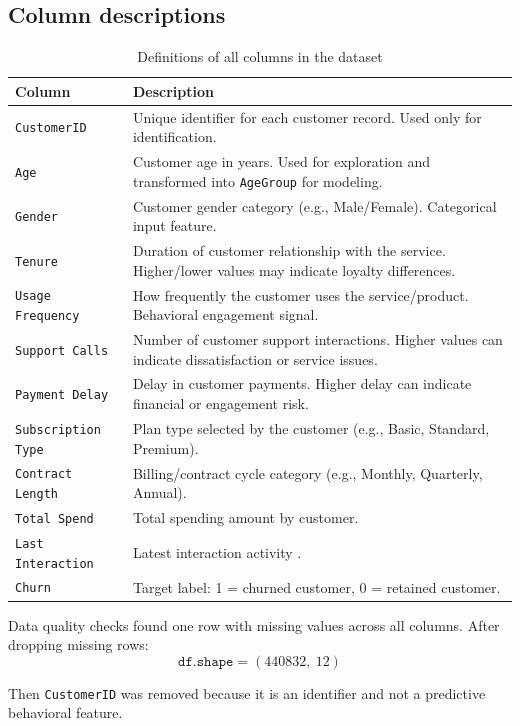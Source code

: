 \documentclass[11pt]{article}
\begin{document}
\subsection*{Column descriptions}
\begin{table}[H]
\centering
\begin{tabular}{p{3.2cm} p{11.2cm}}
\toprule
\textbf{Column} & \textbf{Description} \\
\midrule
\texttt{CustomerID} & Unique identifier for each customer record. Used only for identification. \\
\texttt{Age} & Customer age in years. Used for exploration and transformed into \texttt{AgeGroup} for modeling. \\
\texttt{Gender} & Customer gender category (e.g., Male/Female). Categorical input feature. \\
\texttt{Tenure} & Duration of customer relationship with the service. Higher/lower values may indicate loyalty differences. \\
\texttt{Usage Frequency} & How frequently the customer uses the service/product. Behavioral engagement signal. \\
\texttt{Support Calls} & Number of customer support interactions. Higher values can indicate dissatisfaction or service issues. \\
\texttt{Payment Delay} & Delay in customer payments. Higher delay can indicate financial or engagement risk. \\
\texttt{Subscription Type} & Plan type selected by the customer (e.g., Basic, Standard, Premium). \\
\texttt{Contract Length} & Billing/contract cycle category (e.g., Monthly, Quarterly, Annual). \\
\texttt{Total Spend} & Total spending amount by customer. \\
\texttt{Last Interaction} & Latest interaction activity . \\
\texttt{Churn} & Target label: 1 = churned customer, 0 = retained customer. \\
\bottomrule
\end{tabular}
\caption{Definitions of all columns in the dataset}
\end{table}

Data quality checks found one row with missing values across all columns. After dropping missing rows:
\[
\texttt{df.shape} = (440832,\ 12)
\]

Then \texttt{CustomerID} was removed because it is an identifier and not a predictive behavioral feature.
\end{document}
